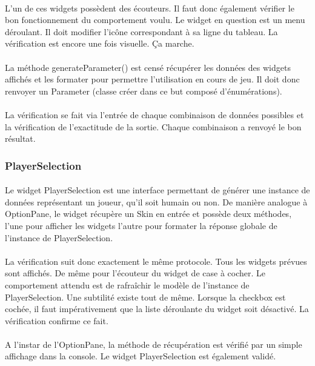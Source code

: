 \documentclass[11pt]{article} %
\begin{document}
\paragraph{} 
L'un de ces widgets possèdent des écouteurs. Il faut donc également vérifier le bon fonctionnement du comportement voulu. Le widget en question est un menu déroulant. Il doit modifier l’icône correspondant à sa ligne du tableau. La vérification est encore une fois visuelle. Ça marche.
\paragraph{}
La méthode generateParameter() est censé récupérer les données des widgets affichés et les formater pour permettre l'utilisation en cours de jeu. Il doit donc renvoyer un Parameter (classe créer dans ce but composé d'énumérations). 
\paragraph{}
La vérification se fait via l'entrée de chaque combinaison de données possibles et la vérification de l'exactitude de la sortie. Chaque combinaison a renvoyé le bon résultat. 

\subsubsection{PlayerSelection}
\paragraph{}
Le widget PlayerSelection est une interface permettant de générer une instance de données représentant un joueur, qu'il soit humain ou non. De manière analogue à OptionPane, le widget récupère un Skin en entrée et possède deux méthodes, l'une pour afficher les widgets l'autre pour formater la réponse globale de l'instance de PlayerSelection.
\paragraph{}
La vérification suit donc exactement le même protocole. Tous les widgets prévues sont affichés. De même pour l'écouteur du widget de case à cocher. Le comportement attendu est de rafraîchir le modèle de l'instance de PlayerSelection. Une subtilité existe tout de même. Lorsque la checkbox est cochée, il faut impérativement que la liste déroulante du widget soit désactivé. La vérification confirme ce fait.
\paragraph{}
A l'instar de l'OptionPane, la méthode de récupération est vérifié par un simple affichage dans la console. Le widget PlayerSelection est également validé.
\end{document}
